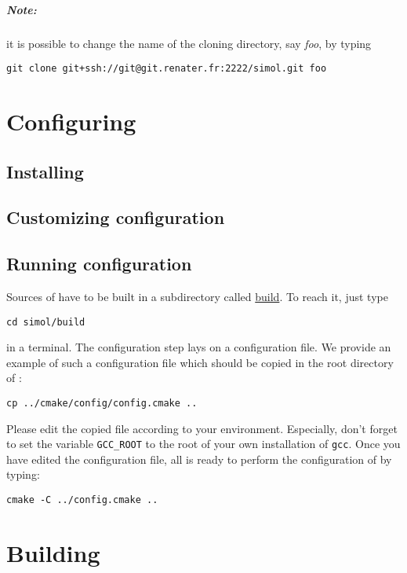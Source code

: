 \paragraph{Note:}
it is possible to change the name of the cloning directory, say \textit{foo}, by typing 
\begin{verbatim}
git clone git+ssh://git@git.renater.fr:2222/simol.git foo
\end{verbatim}




\chapter{Configuring \Simol}\label{chap:configure}


\section{Installing \CMake}

\section{Customizing configuration}

\section{Running configuration}

Sources of \Simol have to be built in a subdirectory called \url{build}. To reach it, just type
\begin{verbatim}
cd simol/build
\end{verbatim}
in a terminal. The configuration step lays on a configuration file. We provide an example of such a configuration file which should be copied in the root directory of \Simol :
\begin{verbatim}
cp ../cmake/config/config.cmake ..
\end{verbatim}
Please edit the copied file according to your environment. Especially, don't forget to set the variable \texttt{GCC\_ROOT} to the root of your own installation of \texttt{gcc}. Once you have edited the configuration file, all is ready to perform the configuration of \Simol by typing:
\begin{verbatim}
cmake -C ../config.cmake ..
\end{verbatim}


\chapter{Building \Simol}

